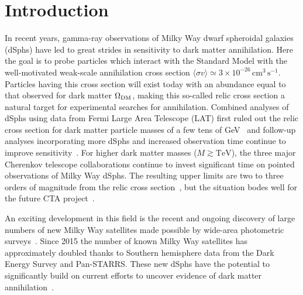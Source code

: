 \documentclass[prd,twocolumn,showpacs,preprintnumbers,superscriptaddress,nofootinbib,amsmath,amssymb,nobalancelastpage]{revtex4}
\def\sigv{{\langle\sigma v\rangle}}
\begin{document}
\maketitle

\section{Introduction}

In recent years, gamma-ray observations of Milky Way dwarf spheroidal galaxies (dSphs) have
led to great strides in sensitivity to dark matter annihilation. Here
the goal is to probe particles which interact with the Standard Model with the well-motivated weak-scale annihilation
cross section $\sigv \simeq 3 \times 10^{-26}\,\mathrm{cm^3 \,s^{-1}}$. Particles having this cross section will exist today with an abundance equal to that observed for dark matter $\Omega_{\rm DM}$, making this so-called relic cross section a natural target for experimental searches for annihilation.
Combined analyses of dSphs using data from
Fermi Large Area Telescope (LAT) first ruled out the relic cross section for dark matter particle masses of a few tens of
GeV~\cite{2011PhRvL.107x1303G,2011PhRvL.107x1302A} and follow-up
analyses incorporating more dSphs and increased observation time
continue to improve
sensitivity~\cite[e.g.][]{2014PhRvD..89d2001A,2015PhRvD..91h3535G,2015PhRvL.115w1301A}. For
higher dark matter masses ($M \gtrsim \mathrm{TeV}$), the three major
Cherenkov telescope collaborations continue to invest significant time
on pointed observations of Milky Way dSphs. The resulting upper limits
are two to three orders of magnitude from the relic cross
section~\cite{2012PhRvD..85f2001A,2014JCAP...02..008A,2014PhRvD..90k2012A,2016JCAP...02..039M,2015arXiv150901105Z},
but the situation bodes well for the future CTA
project~\cite[e.g.][]{2015arXiv150806128C}.

An exciting development in this field is the recent and
ongoing discovery of large numbers of new Milky Way satellites made
possible by wide-area photometric
surveys~\cite[e.g.][]{2015ApJ...805..130K,2015ApJ...807...50B,2015ApJ...802L..18L,2015ApJ...813..109D}. Since
2015 the number of known Milky Way satellites has approximately
doubled thanks to Southern hemisphere data from the Dark Energy Survey
and Pan-STARRS. These new dSphs have the potential to significantly
build on current efforts to uncover evidence of dark matter
annihilation~\cite[e.g.][]{2015PhRvD..91f3515H,2015PhRvL.115h1101G,2015ApJ...809L...4D,2015JCAP...09..016H,2015arXiv151109252L}.
\end{document}
